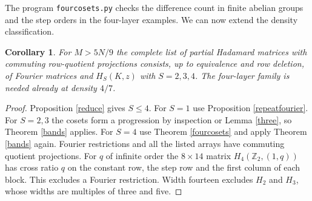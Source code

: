 \documentclass[11pt,a4paper]{article}
\newtheorem{cor}[thm]{Corollary}
\begin{document}
The program \texttt{fourcosets.py} checks the difference count in finite abelian groups and the step orders in the four-layer examples. We can now extend the density classification.

\begin{cor}\label{fivelayersbound}
For $M>5N/9$ the complete list of partial Hadamard matrices with commuting row-quotient projections consists, up to equivalence and row deletion, of Fourier matrices and $H_S(K,z)$ with $S=2,3,4$. The four-layer family is needed already at density $4/7$.
\end{cor}
\begin{proof}
Proposition \ref{reduce} gives $S\leq4$. For $S=1$ use Proposition \ref{repeatfourier}. For $S=2,3$ the cosets form a progression by inspection or Lemma \ref{three}, so Theorem \ref{bands} applies. For $S=4$ use Theorem \ref{fourcosets} and apply Theorem \ref{bands} again. Fourier restrictions and all the listed arrays have commuting quotient projections. For $q$ of infinite order the $8\times14$ matrix $H_4(\mathbb Z_2,(1,q))$ has cross ratio $q$ on the constant row, the step row and the first column of each block. This excludes a Fourier restriction. Width fourteen excludes $H_2$ and $H_3$, whose widths are multiples of three and five.
\end{proof}
\end{document}
